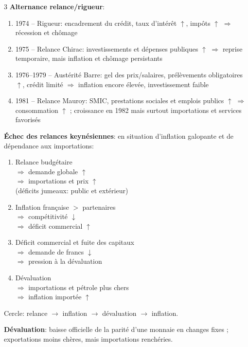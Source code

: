 \documentclass[12pt, a4paper]{article}
\begin{document}
\begin{multicols*}{3}
\textbf{Alternance relance/rigueur}:
\begin{enumerate}[\roman*.]
  \item 1974 -- Rigueur: encadrement du crédit, taux d'intérêt $\uparrow$, impôts $\uparrow$ $\Rightarrow$ récession et chômage
  \item 1975 -- Relance Chirac: investissements et dépenses publiques $\uparrow$ $\Rightarrow$ reprise temporaire, mais inflation et chômage persistants
  \item 1976--1979 -- Austérité Barre: gel des prix/salaires, prélèvements obligatoires $\uparrow$, crédit limité $\Rightarrow$ inflation encore élevée, investissement faible
  \item 1981 -- Relance Mauroy: SMIC, prestations sociales et emplois publics $\uparrow$ $\Rightarrow$ consommation $\uparrow$ ; croissance en 1982 mais surtout importations et services favorisés
\end{enumerate}

\colbreak

\textbf{Échec des relances keynésiennes}: en situation d'inflation galopante et de dépendance aux importations:
\begin{enumerate}[\roman*.]
  \item Relance budgétaire \\$\Rightarrow$ demande globale $\uparrow$ \\$\Rightarrow$ importations et prix $\uparrow$ \\(déficits jumeaux: public et extérieur)
  \item Inflation française $>$ partenaires \\$\Rightarrow$ compétitivité $\downarrow$ \\$\Rightarrow$ déficit commercial $\uparrow$
  \item Déficit commercial et fuite des capitaux \\$\Rightarrow$ demande de francs $\downarrow$ \\$\Rightarrow$ pression à la dévaluation
  \item Dévaluation \\$\Rightarrow$ importations et pétrole plus chers \\$\Rightarrow$ inflation importée $\uparrow$
\end{enumerate}
Cercle: relance $\to$ inflation $\to$ dévaluation $\to$ inflation.

\textbf{Dévaluation}: baisse officielle de la parité d'une monnaie en changes fixes ; exportations moins chères, mais importations renchéries.


\end{multicols*}
\end{document}
